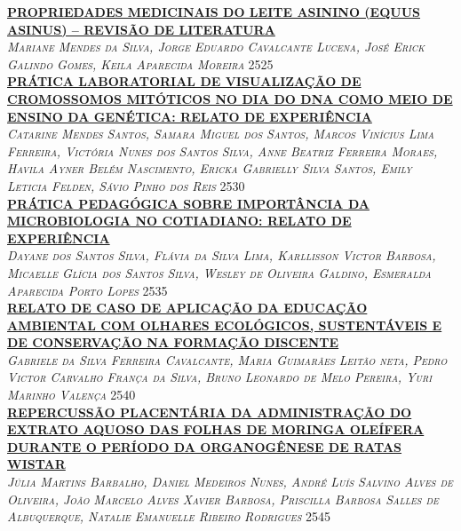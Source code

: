 \noindent \textsc{\hyperlink{trabalhos/251718.pdf.1}{\textbf{PROPRIEDADES MEDICINAIS DO LEITE ASININO (EQUUS ASINUS) – REVISÃO DE LITERATURA}}}\\ 
\noindent \textsc{\textit{Mariane Mendes da Silva, Jorge Eduardo Cavalcante Lucena, José Erick Galindo Gomes, Keila Aparecida Moreira}} \hfill 2525\\ 

\noindent \textsc{\hyperlink{trabalhos/251392.pdf.1}{\textbf{PRÁTICA LABORATORIAL DE VISUALIZAÇÃO DE CROMOSSOMOS MITÓTICOS NO DIA DO DNA COMO MEIO DE ENSINO DA GENÉTICA: RELATO DE EXPERIÊNCIA}}}\\ 
\noindent \textsc{\textit{Catarine Mendes Santos, Samara Miguel dos Santos, Marcos Vinícius Lima Ferreira, Victória Nunes dos Santos Silva, Anne Beatriz Ferreira Moraes, Havila Ayner Belém Nascimento, Ericka Gabrielly Silva Santos, Emily Leticia Felden, Sávio Pinho dos Reis}} \hfill 2530\\ 

\noindent \textsc{\hyperlink{trabalhos/246647.pdf.1}{\textbf{PRÁTICA PEDAGÓGICA SOBRE IMPORTÂNCIA DA MICROBIOLOGIA NO COTIADIANO: RELATO DE EXPERIÊNCIA}}}\\ 
\noindent \textsc{\textit{Dayane dos Santos Silva, Flávia da Silva Lima, Karllisson Victor Barbosa, Micaelle Glícia dos Santos Silva, Wesley de Oliveira Galdino, Esmeralda Aparecida Porto Lopes}} \hfill 2535\\ 

\noindent \textsc{\hyperlink{trabalhos/251754.pdf.1}{\textbf{RELATO DE CASO DE APLICAÇÃO DA EDUCAÇÃO AMBIENTAL COM OLHARES ECOLÓGICOS, SUSTENTÁVEIS E DE CONSERVAÇÃO NA FORMAÇÃO DISCENTE}}}\\ 
\noindent \textsc{\textit{Gabriele da Silva Ferreira Cavalcante, Maria Guimarães Leitão neta, Pedro Victor Carvalho França da Silva, Bruno Leonardo de Melo Pereira, Yuri Marinho Valença}} \hfill 2540\\ 

\noindent \textsc{\hyperlink{trabalhos/250674.pdf.1}{\textbf{REPERCUSSÃO PLACENTÁRIA DA ADMINISTRAÇÃO DO EXTRATO AQUOSO DAS FOLHAS DE MORINGA OLEÍFERA DURANTE O PERÍODO DA ORGANOGÊNESE DE RATAS WISTAR}}}\\ 
\noindent \textsc{\textit{Júlia Martins Barbalho, Daniel Medeiros Nunes, André Luís Salvino Alves de Oliveira, João Marcelo Alves Xavier Barbosa, Priscilla Barbosa Salles de Albuquerque, Natalie Emanuelle Ribeiro Rodrigues}} \hfill 2545\\ 

